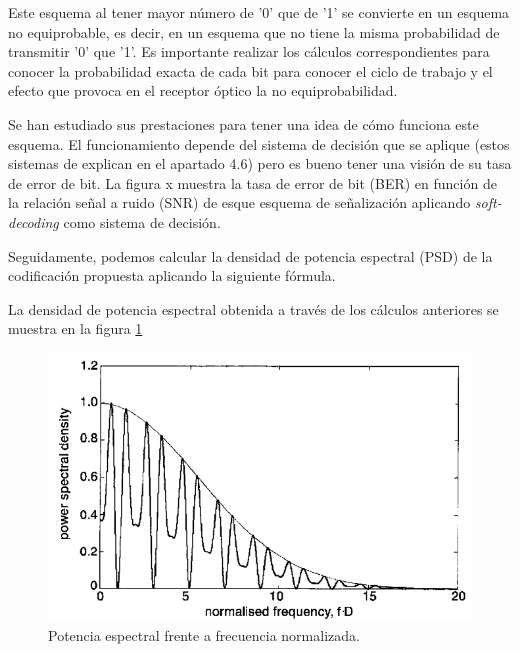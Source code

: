 Este esquema al tener mayor número de '0' que de '1' se convierte en un esquema no 
equiprobable, es decir, en un esquema que no tiene la misma probabilidad de transmitir 
'0' que '1'. Es importante realizar los cálculos correspondientes para conocer la 
probabilidad exacta de cada bit para conocer el ciclo de trabajo y el efecto que 
provoca en el receptor óptico la no equiprobabilidad.

Se han estudiado sus prestaciones para tener una idea de cómo funciona este esquema. 
El funcionamiento depende del sistema de decisión que se aplique (estos sistemas de 
explican en el apartado 4.6) pero es bueno tener una visión de su tasa de error de bit.
La figura x muestra la tasa de error de bit (BER) en función de la relación señal a ruido
(SNR) de esque esquema de señalización aplicando \textit{soft-decoding} como sistema de 
decisión. 

Seguidamente, podemos calcular la densidad de potencia espectral (PSD) de la 
codificación propuesta aplicando la siguiente fórmula.

La densidad de potencia espectral obtenida a través de los cálculos
anteriores se muestra en la figura \ref{psd_alternos}
\begin{figure}[ht]
    \centering
    \includegraphics[scale=0.5]{./figuras/psd_alternos.png}
    \caption{\small{Potencia espectral frente a frecuencia normalizada.}}
    \label{psd_alternos}%
\end{figure}

